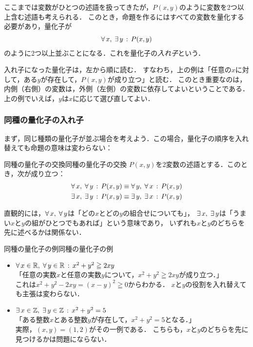 ここまでは変数がひとつの述語を扱ってきたが，$P(x, y)$のように変数を2つ以上含む述語も考えられる．
このとき，命題を作るにはすべての変数を量化する必要があり，量化子が
\[
  \forall\, x ,\; \exists\, y \,:\, P(x, y)
\]
のように2つ以上並ぶことになる．これを量化子の\emph{入れ子}という．
 
入れ子になった量化子は，左から順に読む．
すなわち，上の例は「任意の$x$に対して，ある$y$が存在して，$P(x, y)$が成り立つ」と読む．
このとき重要なのは，内側（右側）の変数は，外側（左側）の変数に依存してよいということである．
上の例でいえば，$y$は$x$に応じて選び直してよい．
 
\subsubsection{同種の量化子の入れ子}
 
まず，同じ種類の量化子が並ぶ場合を考えよう．この場合，量化子の順序を入れ替えても命題の意味は変わらない：
 
\begin{prop}{同種の量化子の交換}{同種の量化子の交換}
  $P(x, y)$を2変数の述語とする．このとき，次が成り立つ：
  \begin{align*}
    \forall\, x ,\; \forall\, y \,:\, P(x, y) & \equiv \forall\, y ,\; \forall\, x \,:\, P(x, y) \\
    \exists\, x ,\; \exists\, y \,:\, P(x, y) & \equiv \exists\, y ,\; \exists\, x \,:\, P(x, y)
  \end{align*}
\end{prop}
 
直観的には，$\forall\, x ,\; \forall\, y$は「どの$x$とどの$y$の組合せについても」，
$\exists\, x ,\; \exists\, y$は「うまい$x$と$y$の組がひとつでもあれば」という意味であり，
いずれも$x$と$y$のどちらを先に述べるかは関係ない．
 
\begin{example}{同種の量化子の例}{同種の量化子の例}
  \begin{itemize}
    \item $\forall\, x \in \mathbb{R} ,\; \forall\, y \in \mathbb{R} \,:\, x^2 + y^2 \geqq 2xy$\\
          「任意の実数$x$と任意の実数$y$について，$x^2 + y^2 \geqq 2xy$が成り立つ．」\\
          これは$x^2 + y^2 - 2xy = (x - y)^2 \geqq 0$からわかる．
          $x$と$y$の役割を入れ替えても主張は変わらない．
    \item $\exists\, x \in \mathbb{Z} ,\; \exists\, y \in \mathbb{Z} \,:\, x^2 + y^2 = 5$\\
          「ある整数$x$とある整数$y$が存在して，$x^2 + y^2 = 5$となる．」\\
          実際，$(x, y) = (1, 2)$がその一例である．
          こちらも，$x$と$y$のどちらを先に見つけるかは問題にならない．
  \end{itemize}
\end{example}
 
